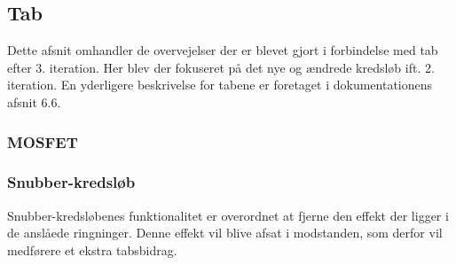 
\subsection{Tab}
Dette afsnit omhandler de overvejelser der er blevet gjort i forbindelse med tab efter 3. iteration. Her blev der fokuseret på det nye og ændrede kredsløb ift. 2. iteration. En yderligere beskrivelse for tabene er foretaget i dokumentationens afsnit 6.6.

\subsubsection{MOSFET}



\subsubsection{Snubber-kredsløb}
\noindent Snubber-kredsløbenes funktionalitet er overordnet at fjerne den effekt der ligger i de anslåede ringninger. Denne effekt vil blive afsat i modstanden, som derfor vil medførere et ekstra tabsbidrag.
